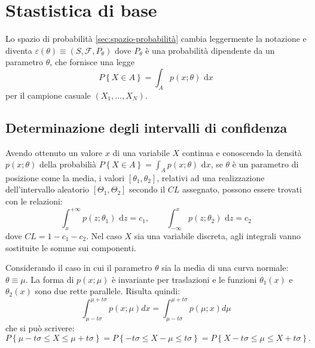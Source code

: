 \chapter{Stastistica di base} %
Lo spazio di probabilità \ref{sec:spazio-probabilità} cambia leggermente la notazione e diventa $\varepsilon (\theta) \equiv (S,\mathcal{F},P_\theta)$ dove $P_\theta$ è una probabilità dipendente da un parametro $\theta$, che fornisce una legge
\begin{equation}
\label{eq:densità-probab-stat}
P\left\{ X\in A \right\} =\int _{ A }{ p\left( x;\theta  \right) \textrm{ d}x }
\end{equation}
per il campione casuale $\left( { X }_{ 1 },\dots ,{ X }_{ N } \right)$.
\section{Determinazione degli intervalli di confidenza} %
\label{sec:deter-intervalli-confidenza}
Avendo ottenuto un valore $x$ di una variabile $X$ continua e conoscendo la densità $p\left( x;\theta  \right)$ della probabilià $P\left\{ X\in A \right\} =\int _{ A }{ p\left( x;\theta  \right) \textrm{ d}x }$, se $\theta$ è un parametro di posizione come la media, i valori $[\theta_1,\theta_2]$, relativi ad una realizzazione dell'intervallo aleatorio $[\Theta_1,\Theta_2]$ secondo il $CL$ assegnato, possono essere trovati con le relazioni:
\begin{equation}
\int _{ x }^{ +\infty  }{ p\left( z;{ \theta  }_{ 1 } \right) \textrm{ d}z}={ c }_{ 1 },\qquad \int _{ -\infty  }^{ x }{ p\left( z;{ \theta  }_{ 2 } \right) \textrm{ d}z } ={ c }_{ 2 }
\end{equation}
dove $CL=1-c_1-c_2$. Nel caso $X$ sia una variabile discreta, agli integrali vanno sostituite le somme sui componenti.

Considerando il caso in cui il parametro $\theta$ sia la media di una curva normale: $\theta \equiv \mu$. La forma di $p(x;\mu)$ è invariante per traslazioni e le funzioni $\theta_1(x)$ e $\theta_2(x)$ sono due rette parallele. Risulta quindi:
\[
\int _{ \mu -t\sigma  }^{ \mu +t\sigma  }{ p\left( x;\mu  \right) dx } =\int _{ \mu -t\sigma  }^{ \mu +t\sigma  }{ p\left( \mu ;x \right) d\mu  } 
\]
che si può scrivere:
\begin{equation}
\label{eq:caso-gaussiano}
P\left\{ \mu -t\sigma \le X\le \mu +t\sigma  \right\} =P\left\{ -t\sigma \le X-\mu \le t\sigma  \right\} =P\left\{ X-t\sigma \le \mu \le X+t\sigma  \right\} .
\end{equation}


